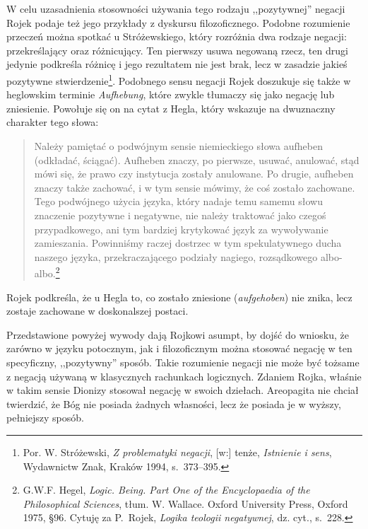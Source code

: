 W celu uzasadnienia stosowności używania tego rodzaju ,,pozytywnej''
negacji Rojek podaje też jego przykłady z dyskursu filozoficznego.
Podobne rozumienie przeczeń  można spotkać u Stróżewskiego, który
rozróżnia dwa rodzaje negacji: przekreślający oraz różnicujący. Ten
pierwszy usuwa negowaną rzecz, ten drugi jedynie podkreśla różnicę i jego
rezultatem nie jest brak, lecz w zasadzie jakieś pozytywne
stwierdzenie\footnote{Por. W. Stróżewski, \textit{Z problematyki negacji}, [w:]
tenże, \textit{Istnienie i sens}, Wydawnictw Znak, Kraków 1994,
s.~373--395.}. Podobnego sensu negacji Rojek doszukuje się także
w heglowskim terminie \textit{Aufhebung}, które zwykle tłumaczy się
jako negację lub zniesienie. Powołuje się on na cytat z Hegla, który
wskazuje na dwuznaczny charakter tego słowa:

\begin{quote}
    Należy pamiętać o podwójnym sensie niemieckiego słowa aufheben
(odkładać, ściągać). Aufheben znaczy, po pierwsze, usuwać, anulować,
stąd mówi się, że prawo czy instytucja zostały anulowane. Po drugie,
aufheben znaczy także zachować, i w tym sensie mówimy, że coś zostało
zachowane. Tego podwójnego użycia języka, który nadaje temu samemu
słowu znaczenie pozytywne i negatywne, nie należy traktować jako czegoś
przypadkowego, ani tym bardziej krytykować język za wywoływanie
zamieszania. Powinniśmy raczej dostrzec w tym spekulatywnego ducha
naszego języka, przekraczającego podziały nagiego, rozsądkowego
albo-albo.\footnote{G.W.F. Hegel, \textit{Logic. Being. Part One of the
Encyclopaedia of the Philosophical Sciences}, tłum. W. Wallace. Oxford
University Press, Oxford 1975, §96. Cytuję za P.~Rojek, \textit{Logika teologii negatywnej}, dz. cyt.,
s.~228.}
\end{quote}
Rojek podkreśla, że u Hegla to, co zostało zniesione
(\textit{aufgehoben}) nie znika, lecz zostaje zachowane w doskonalszej
postaci.

Przedstawione powyżej wywody dają Rojkowi asumpt, by dojść do wniosku, że zarówno w języku
potocznym, jak i filozoficznym można stosować negację w ten
specyficzny, ,,pozytywny'' sposób. Takie rozumienie negacji nie może być
tożsame z negacją używaną w klasycznych rachunkach logicznych. Zdaniem
Rojka, właśnie w takim sensie Dionizy stosował negację w swoich
dziełach. Areopagita nie chciał twierdzić, że Bóg nie posiada żadnych
własności, lecz że posiada je w wyższy, pełniejszy sposób.

